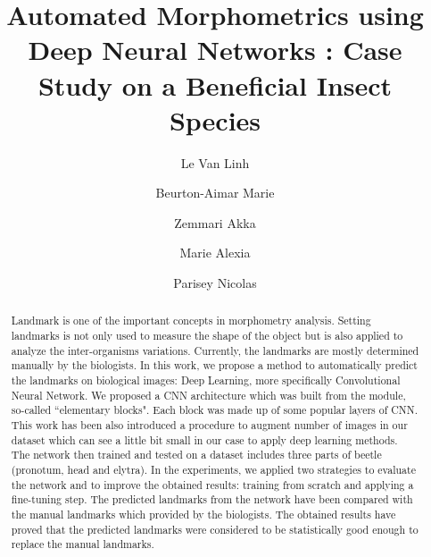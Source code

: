 \documentclass[review]{elsarticle}
\begin{document}
\begin{frontmatter}

  \title{Automated Morphometrics using Deep Neural Networks : Case Study on a Beneficial Insect Species}




\author[labri]{Le Van Linh}
\author[labri]{Beurton-Aimar Marie}
\author[labri]{Zemmari Akka}
\author[igepp]{Marie Alexia}
\author[igepp]{Parisey Nicolas}


\address[labri]{LaBRI - University of Bordeaux, UMR 5800, 351, cours de la Liberation, 33405 Talence, France}
\address[igepp]{UMR 1349 IGEPP, BP 35327, 35653 Le Rheu, France}


\begin{abstract}
Landmark is one of the important concepts in morphometry analysis. Setting landmarks is not only used to measure the shape of the object but is also applied to analyze the inter-organisms variations. Currently, the landmarks are mostly determined manually by the biologists.
In this work, we propose a method to automatically predict the landmarks on biological images: Deep Learning, more specifically Convolutional Neural Network. We proposed a CNN architecture which was built from the module, so-called ``elementary blocks". Each block was made up of some popular layers of CNN. This work has been also introduced a procedure to augment number of images in our dataset which can see a little bit small in our case to apply deep learning methods. 
The network then trained and tested on a dataset includes three parts of beetle (pronotum, head and elytra). In the experiments, we applied two strategies to evaluate the network and to improve the obtained results: training from scratch and applying a fine-tuning step. The predicted landmarks from the network have been compared with the manual landmarks which provided by the biologists. The obtained results have proved that the predicted landmarks were considered to be statistically good enough to replace the manual landmarks.
\end{abstract}


\end{frontmatter}
\end{document}
